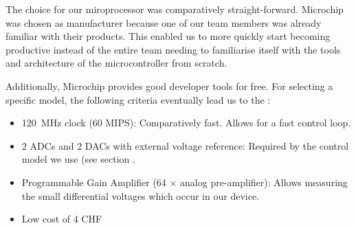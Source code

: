 The choice for our miroprocessor was comparatively straight-forward. Microchip
was  chosen as  manufacturer  because  one of  our  team  members was  already
familiar with their  products. This enabled us to more  quickly start becoming
productive instead of  the entire team needing to familiarise  itself with the
tools and architecture of the microcontroller from scratch.

Additionally, Microchip provides good developer tools for free. For selecting
a specific model, the following criteria eventually lead us to the :

\begin{itemize}
    \item
        \SI{120}{\mega\hertz} clock (60 MIPS): Comparatively fast. Allows for a
        fast control loop.
    \item
        2 ADCs  and 2  DACs with external  voltage reference: Required  by the
        control model we use (see section .
    \item
        Programmable Gain Amplifier (64 $\times$ analog pre-amplifier): Allows
        measuring the small differential voltages which occur in our device.
    \item
        Low cost of 4 CHF
\end{itemize}

